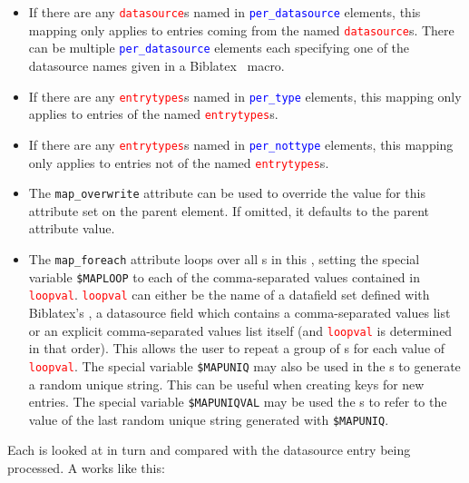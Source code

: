 \documentclass{ltxdockit}
\newcommand*{\biblatex}{Biblatex\xspace}
\begin{document}
\begin{itemize}
\item If there are any \textcolor{red}{\texttt{datasource}}s named in
  \textcolor{blue}{\texttt{per\_datasource}} elements, this mapping only applies to entries
  coming from the named \textcolor{red}{\texttt{datasource}}s. There can be
  multiple \textcolor{blue}{\texttt{per\_datasource}} elements each specifying one of the
  datasource names given in a \biblatex\ \verb++ macro.
\item If there are any \textcolor{red}{\texttt{entrytypes}}s named in
  \textcolor{blue}{\texttt{per\_type}} elements, this mapping only applies to entries
  of the named \textcolor{red}{\texttt{entrytypes}}s.
\item If there are any \textcolor{red}{\texttt{entrytypes}}s named in
  \textcolor{blue}{\texttt{per\_nottype}} elements, this mapping only applies to entries
  not of the named \textcolor{red}{\texttt{entrytypes}}s.
\item The \texttt{map\_overwrite} attribute can be used to override the
  value for this attribute set on the parent  element. If
  omitted, it defaults to the parent  attribute value.
\item The \texttt{map\_foreach} attribute loops over all s in
  this , setting the special variable \verb+$MAPLOOP+ to each of
  the comma-separated values contained in
  \textcolor{red}{\texttt{loopval}}. \textcolor{red}{\texttt{loopval}} can
  either be the name of a datafield set defined with \biblatex's
  , a datasource field which contains a
  comma-separated values list or an explicit comma-separated values list
  itself (and \textcolor{red}{\texttt{loopval}} is determined in that
  order). This allows the user to repeat a group of s for
  each value of \textcolor{red}{\texttt{loopval}}. The special variable
  \verb+$MAPUNIQ+ may also be used in the s to generate a
  random unique string. This can be useful when creating keys for new
  entries. The special variable \verb+$MAPUNIQVAL+ may be used the
  s to refer to the value of the last random unique string
  generated with \verb+$MAPUNIQ+.
\end{itemize}

\noindent Each  is looked at in turn and compared with the
datasource entry being processed. A  works like this:
\end{document}
